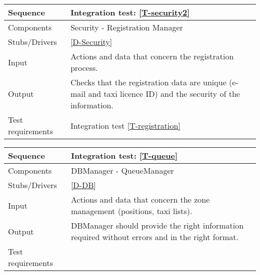 \begin{table}[H]
    \begin{tabularx}{\textwidth}{l|X}
        \hline
        Sequence
        & 
        Integration test: \ref{T-security2}
        \\ \hline
        Components 
        & 
        Security - Registration Manager
        \\ \hline
        Stubs/Drivers 
        & 
        \ref{D-Security}
        \\ \hline
        Input 
        & 
        Actions and data that concern the registration process. 
        \\ \hline
        Output 
        & 
        Checks that the registration data are unique (e-mail and taxi licence ID) and the security of the information.
        \\ \hline
        Test requirements 
        & 
        Integration test \ref{T-registration}
        \\ \hline
    \end{tabularx}
\end{table}

\begin{table}[H]
    \begin{tabularx}{\textwidth}{l|X}
        \hline
        Sequence
        & 
        Integration test: \ref{T-queue}
        \\ \hline
        Components 
        & 
        DBManager - QueueManager
        \\ \hline
        Stubs/Drivers 
        & 
        \ref{D-DB}
        \\ \hline
        Input 
        & 
        Actions and data that concern the zone management (positions, taxi lists). 
        \\ \hline
        Output 
        & 
        DBManager should provide the right information required without errors and in the right format.
        \\ \hline
        Test requirements 
        & 
        
        \\ \hline
    \end{tabularx}
\end{table}

